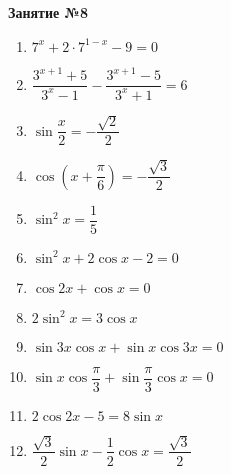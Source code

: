 \documentclass[12pt, a4paper]{article}
\begin{document}
	
   \cfoot{}
\begin{center}
	\Large
	\textbf{Занятие №8}
\end{center}
\begin{multicols}{2}
	\begin{enumerate}[label=\textbf{\arabic*.}]
		\item \( 7^x+2\cdot7^{1-x}-9=0 \)
		\item \( \dfrac{3^{x+1}+5}{3^x-1}-\dfrac{3^{x+1}-5}{3^x+1}=6 \)
		\item \( \sin \dfrac{x}{2} = -\dfrac{\sqrt{2}}{2} \)
		\item \( \cos\left(x+\dfrac{\pi}{6}\right)=-\dfrac{\sqrt{3}}{2} \)
		\item \( \sin^2 x = \dfrac{1}{5} \)
		\item \( \sin^2 x + 2\cos x - 2 = 0 \)
		\item \( \cos 2x + \cos x = 0 \)
		\item \( 2\sin^2 x = 3\cos x \)
		\item \( \sin3x\cos x + \sin x\cos 3x = 0 \)
		\item \( \sin x\cos\dfrac{\pi}{3}+\sin\dfrac{\pi}{3}\cos x = 0 \)
		\item \( 2\cos 2x - 5 = 8\sin x \)
		\item \( \dfrac{\sqrt{3}}{2}\sin x - \dfrac{1}{2}\cos x = \dfrac{\sqrt{3}}{2} \)
	\end{enumerate}
\end{multicols}
\end{document}

